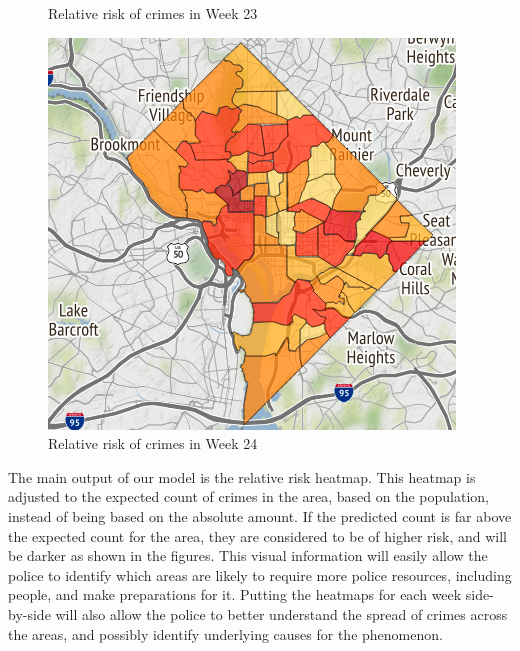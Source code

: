 \documentclass[letterpaper]{article}
\begin{document}
\begin{figure}[!ht]
		\caption{Relative risk of crimes in Week 23}
		\label{p4}
		\endminipage\hfill
		\includegraphics[width=\linewidth]{./w24_relative.png}
		\caption{Relative risk of crimes in Week 24}
		\label{p5}
		\endminipage\hfill
	\end{figure}
	The main output of our model is the relative risk heatmap. This heatmap is adjusted to the expected count of crimes in the area, based on the population, instead of being based on the absolute amount. If the predicted count is far above the expected count for the area, they are considered to be of higher risk, and will be darker as shown in the figures. This visual information will easily allow the police to identify which areas are likely to require more police resources, including people, and make preparations for it. Putting the heatmaps for each week side-by-side will also allow the police to better understand the spread of crimes across the areas, and possibly identify underlying causes for the phenomenon.
\end{document}

